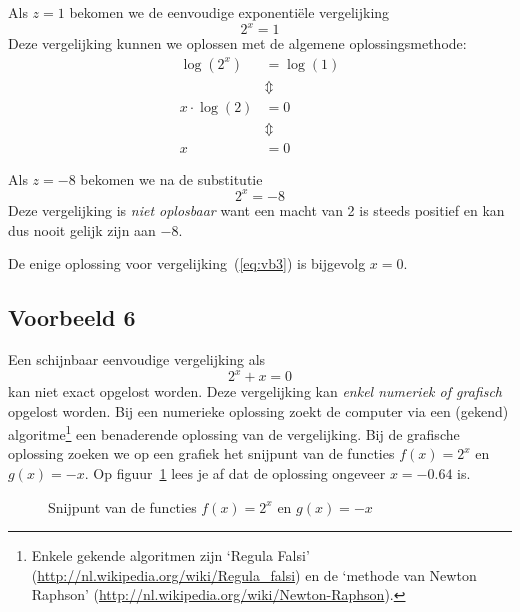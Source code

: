 Als $z=1$ bekomen we de eenvoudige exponenti\"ele vergelijking
\[
 2^{x}  =  1
\]
Deze vergelijking kunnen we oplossen met de algemene oplossingsmethode:
\begin{align*}
    \log\left(2^x\right) &=  \log(1) \\
     &\Updownarrow  \\
    x\cdot \log(2) &= 0 \\
     &\Updownarrow  \\
    x &=  0
\end{align*}

Als $z=-8$ bekomen we na de substitutie
 \begin{displaymath}
    2^{x} = -8  
    \end{displaymath}
    Deze  vergelijking is \emph{niet oplosbaar} want een macht van 2 is steeds positief en kan dus nooit gelijk zijn aan $-8$. 
    
   De enige oplossing voor vergelijking~(\ref{eq:vb3}) is bijgevolg $x=0$.

    \subsection{Voorbeeld 6}
    Een schijnbaar eenvoudige vergelijking als
    \begin{displaymath}
        2^{x}+x = 0
    \end{displaymath}
      kan niet exact opgelost worden. Deze
      vergelijking kan \emph{enkel numeriek of grafisch} opgelost worden.
      Bij een numerieke oplossing zoekt de computer via een (gekend) algoritme\footnote{Enkele gekende algoritmen zijn `Regula Falsi' (\url{http://nl.wikipedia.org/wiki/Regula\_falsi}) en de `methode van Newton Raphson' (\url{http://nl.wikipedia.org/wiki/Newton-Raphson}).} een benaderende oplossing van de vergelijking. 
      Bij de grafische oplossing zoeken we op een grafiek het snijpunt van de functies $f(x)=2^x$ en $g(x)=-x$.
      Op figuur~\ref{fig:snijp3} lees je af dat de oplossing ongeveer $x=\num{-0.64}$ is.
\begin{figure}[htbp]
  \centering
  \caption{Snijpunt van de functies $f(x)=2^x$ en $g(x)=-x$}
  \label{fig:snijp3}
\end{figure}

